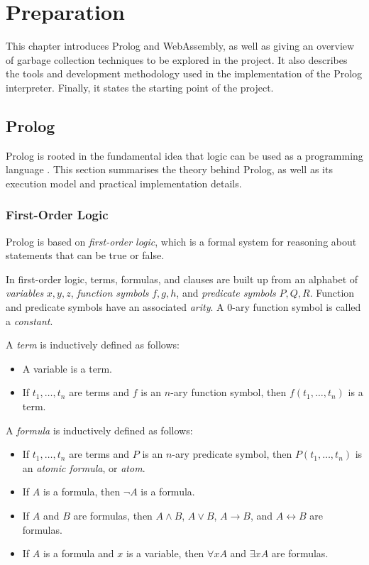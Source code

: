 \chapter{Preparation}

This chapter introduces Prolog and WebAssembly, as well as giving an overview of garbage collection techniques to be explored in the project. It also describes the tools and development methodology used in the implementation of the Prolog interpreter. Finally, it states the starting point of the project.

\section{Prolog}

Prolog is rooted in the fundamental idea that logic can be used as a programming language \cite{kowalskiPredicateLogicProgramming1974}. This section summarises the theory behind Prolog, as well as its execution model and practical implementation details.

\subsection{First-Order Logic}

Prolog is based on \emph{first-order logic}, which is a formal system for reasoning about statements that can be true or false.

In first-order logic, terms, formulas, and clauses are built up from an alphabet of \emph{variables} $x, y, z$, \emph{function symbols} $f, g, h$, and \emph{predicate symbols} $P, Q, R$. Function and predicate symbols have an associated \emph{arity}. A $0$-ary function symbol is called a \emph{constant}.

\begin{definition}
A \emph{term} is inductively defined as follows:
\begin{itemize}
\item A variable is a term.
\item If $t_1, \ldots, t_n$ are terms and $f$ is an $n$-ary function symbol, then $f(t_1, \ldots, t_n)$ is a term.
\end{itemize}
\end{definition}

\begin{definition}
A \emph{formula} is inductively defined as follows:
\begin{itemize}
\item If $t_1, \ldots, t_n$ are terms and $P$ is an $n$-ary predicate symbol, then $P(t_1, \ldots, t_n)$ is an \emph{atomic formula}, or \emph{atom}.
\item If $A$ is a formula, then $\neg A$ is a formula.
\item If $A$ and $B$ are formulas, then $A \land B$, $A \lor B$, $A \rightarrow B$, and $A \leftrightarrow B$ are formulas.
\item If $A$ is a formula and $x$ is a variable, then $\forall x A$ and $\exists x A$ are formulas.
\end{itemize}
\end{definition}

